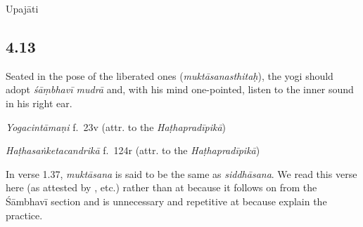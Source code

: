 \begin{ekdosis}
\begin{testimonia}[hp04_012]
\end{testimonia}


\begin{metre}[hp04_012]
Upajāti
\end{metre}

\subsection*{4.13}
\begin{translation}[hp04_013]
Seated in the pose of the liberated ones (\emph{muktāsanasthitaḥ}), the yogi should adopt \emph{śāṃbhavī mudrā} and, with his mind one-pointed, listen to the inner sound in his right ear.
\end{translation}


\begin{testimonia}[hp04_013]
\emph{Yogacintāmaṇi} f.~23v (attr. to the \emph{Haṭhapradīpikā})
\begin{versinnote}
\end{versinnote}

\emph{Haṭhasaṅketacandrikā} f.~124r (attr. to the \emph{Haṭhapradīpikā})
\begin{versinnote}
\tl{\var{dakṣiṇe karṇe ] B220,  dakṣirṇe 2244}\\+}
\tl{\var{ekāṃtike ] 2244, ekāṃtate B220}\\!}
\end{versinnote}
\end{testimonia}

\begin{philcomm}[hp04_013]
In verse 1.37, \emph{muktāsana} is said to be the same as \emph{siddhāsana}.
We read this verse here (as attested by \textalpha, etc.) rather than at  because it follows on from the Śāmbhavī section and is unnecessary and repetitive at  because  explain the practice.
\end{philcomm}


\end{ekdosis}

